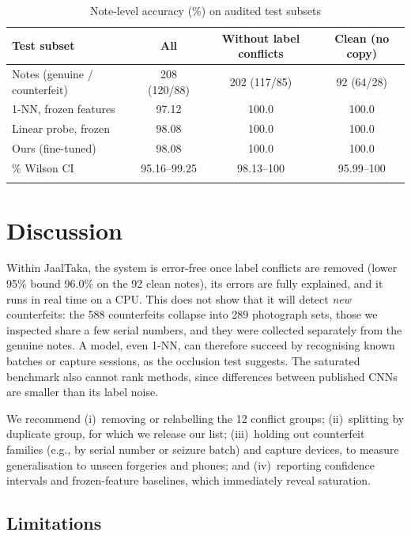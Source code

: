 \documentclass[pdflatex,sn-mathphys-num]{sn-jnl}
\begin{document}
\begin{table}[!t]
\caption{Note-level accuracy (\%) on audited test subsets}\label{tab:clean}
\begin{tabular*}{\textwidth}{@{\extracolsep\fill}lccc}
\toprule
Test subset & All & Without label conflicts & Clean (no copy) \\
\midrule
Notes (genuine / counterfeit) & 208 (120/88) & 202 (117/85) & 92 (64/28) \\
\midrule
1-NN, frozen features & 97.12 & 100.0 & 100.0 \\
Linear probe, frozen & 98.08 & 100.0 & 100.0 \\
Ours (fine-tuned) & 98.08 & 100.0 & 100.0 \\
\quad 95\% Wilson CI & 95.16--99.25 & 98.13--100 & 95.99--100 \\
\botrule
\end{tabular*}
\end{table}

\section{Discussion}\label{sec:discussion}

Within JaalTaka, the system is error-free once label conflicts are removed (lower 95\%
bound 96.0\% on the 92 clean notes), its errors are fully explained, and it runs in real
time on a CPU. This does not show that it will detect \emph{new} counterfeits: the 588
counterfeits collapse into 289 photograph sets, those we inspected share a few serial
numbers, and they were collected separately from the genuine notes. A model, even 1-NN,
can therefore succeed by recognising known batches or capture sessions, as the occlusion
test suggests. The saturated benchmark also cannot rank methods, since differences
between published CNNs are smaller than its label noise.

We recommend (i)~removing or relabelling the 12 conflict groups; (ii)~splitting by
duplicate group, for which we release our list; (iii)~holding out counterfeit families
(e.g., by serial number or seizure batch) and capture devices, to measure generalisation
to unseen forgeries and phones; and (iv)~reporting confidence intervals and
frozen-feature baselines, which immediately reveal saturation.

\subsection{Limitations}\label{sec:limits}
\end{document}
